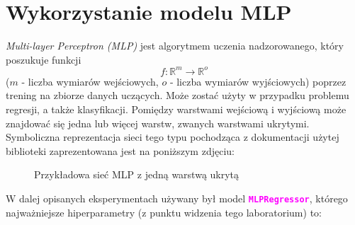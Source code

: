 \documentclass{article}
\newcommand{\code}[1]{\textcolor{Fuchsia}{\textbf{\texttt{#1}}}}
\begin{document}
\section{Wykorzystanie modelu MLP}
    \textit{Multi-layer Perceptron (MLP)} jest algorytmem uczenia nadzorowanego, który poszukuje funkcji
    $$f: \mathbb{R}^{m} \rightarrow \mathbb{R}^{o}$$
    ($m$ - liczba wymiarów wejściowych, $o$ - liczba wymiarów wyjściowych) poprzez trening na zbiorze danych uczących. Może zostać użyty w przypadku problemu regresji, a także klasyfikacji. Pomiędzy warstwami wejściową i wyjściową może znajdować się jedna lub więcej warstw, zwanych warstwami ukrytymi. Symboliczna reprezentacja sieci tego typu pochodząca z dokumentacji użytej biblioteki \cite{scikit} zaprezentowana jest na poniższym zdjęciu:
    \begin{figure}[!htbp]%
        \centering
        \caption{Przykładowa sieć MLP z jedną warstwą ukrytą}%
        \label{fig:mlp_example}
    \end{figure}

    \noindent W dalej opisanych eksperymentach używany był model \code{MLPRegressor}, którego najważniejsze hiperparametry (z punktu widzenia tego laboratorium) to:
\end{document}
